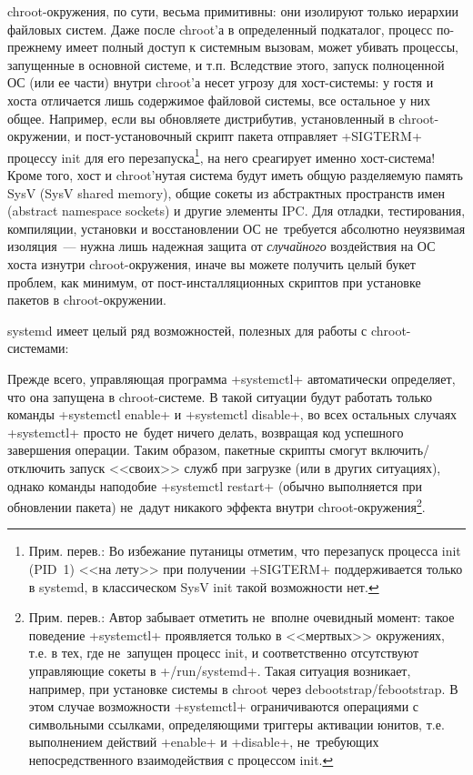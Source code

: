 \documentclass[10pt,oneside,a4paper]{article}
\begin{document}
chroot-окружения, по сути, весьма примитивны: они изолируют только иерархии
файловых систем. Даже после chroot'а в определенный подкаталог, процесс
по-прежнему имеет полный доступ к системным вызовам, может убивать процессы,
запущенные в основной системе, и т.п. Вследствие этого, запуск полноценной ОС
(или ее части) внутри chroot'а несет угрозу для хост-системы: у гостя и хоста
отличается лишь содержимое файловой системы, все остальное у них общее.
Например, если вы обновляете дистрибутив, установленный в chroot-окружении, и
пост-установочный скрипт пакета отправляет +SIGTERM+ процессу init для его
перезапуска\footnote{Прим. перев.: Во избежание путаницы отметим, что перезапуск
процесса init (PID~1) <<на лету>> при получении +SIGTERM+ поддерживается только
в systemd, в классическом SysV init такой возможности нет.}, на него среагирует
именно хост-система! Кроме того, хост и chroot'нутая система будут иметь общую
разделяемую память SysV (SysV shared memory), общие сокеты из абстрактных
пространств имен (abstract namespace sockets) и другие элементы IPC. Для
отладки, тестирования, компиляции, установки и восстановлении ОС не~требуется
абсолютно неуязвимая изоляция~--- нужна лишь надежная защита от
\emph{случайного} воздействия на ОС хоста изнутри chroot-окружения, иначе вы
можете получить целый букет проблем, как минимум, от пост-инсталляционных
скриптов при установке пакетов в chroot-окружении.

systemd имеет целый ряд возможностей, полезных для работы с chroot-системами:

Прежде всего, управляющая программа +systemctl+ автоматически определяет, что
она запущена в chroot-системе. В такой ситуации будут работать только команды
+systemctl enable+ и +systemctl disable+, во всех остальных случаях +systemctl+
просто не~будет ничего делать, возвращая код успешного завершения операции.
Таким образом, пакетные скрипты смогут включить/отключить запуск <<своих>> служб
при загрузке (или в других ситуациях), однако команды наподобие
+systemctl restart+ (обычно выполняется при обновлении пакета) не~дадут никакого
эффекта внутри chroot-окружения\footnote{Прим. перев.: Автор забывает отметить
не~вполне очевидный момент: такое поведение +systemctl+ проявляется только в
<<мертвых>> окружениях, т.е. в тех, где не~запущен процесс init, и
соответственно отсутствуют управляющие сокеты в +/run/systemd+. Такая ситуация
возникает, например, при установке системы в chroot через
debootstrap/febootstrap. В этом случае возможности +systemctl+ ограничиваются
операциями с символьными ссылками, определяющими триггеры активации юнитов, т.е.
выполнением действий +enable+ и +disable+, не~требующих непосредственного
взаимодействия с процессом init.}.
\end{document}
